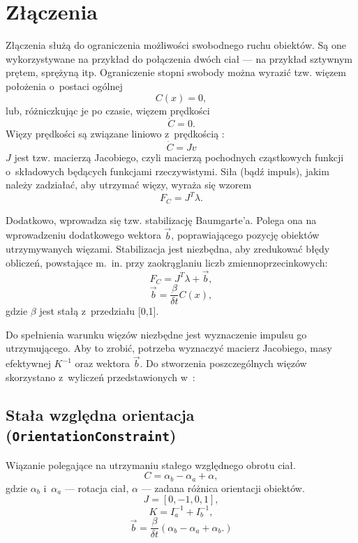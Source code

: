 \section{Złączenia}
Złączenia służą do ograniczenia możliwości swobodnego ruchu obiektów. Są one wykorzystywane na przykład do połączenia dwóch ciał --- na przykład sztywnym prętem, sprężyną itp. 
Ograniczenie stopni swobody można wyrazić tzw. więzem położenia o~postaci ogólnej
\begin{equation}
C(x) = 0,
\end{equation} lub, różniczkując je po czasie, więzem prędkości
\begin{equation}
\dot{C} = 0.
\end{equation}
Więzy prędkości są związane liniowo z~prędkością \cite{bib:catto-modeling-constraints}:
\begin{equation}
\dot{C} = J v 
\end{equation}
$J$ jest tzw. macierzą Jacobiego, czyli macierzą pochodnych cząstkowych funkcji o~składowych będących funkcjami rzeczywistymi. Siła (bądź impuls), jakim należy zadziałać, aby utrzymać więzy, wyraża się wzorem
\begin{equation}
F_C = J^T \lambda.
\end{equation}

Dodatkowo, wprowadza się tzw. stabilizację Baumgarte'a. Polega ona na wprowadzeniu dodatkowego wektora $\vec{b}$, poprawiającego pozycję obiektów utrzymywanych więzami. Stabilizacja jest niezbędna, aby zredukować błędy obliczeń, powstające m.~in. przy zaokrąglaniu liczb zmiennoprzecinkowych:
\begin{equation}
F_C = J^T \lambda + \vec{b},
\end{equation}
\begin{equation}
\vec{b} = \frac{\beta}{\delta t} C(x),
\end{equation}
gdzie $\beta$ jest stałą z~przedziału [0,1].

Do spełnienia warunku więzów niezbędne jest wyznaczenie impulsu go utrzymującego. Aby to zrobić, potrzeba wyznaczyć macierz Jacobiego, masy efektywnej $K^{-1}$ oraz wektora $\vec{b}$. Do stworzenia poszczególnych więzów skorzystano z~wyliczeń przedstawionych w~\cite{bib:barnas}:
\subsection*{Stała względna orientacja (\texttt{OrientationConstraint})}
Wiązanie polegające na utrzymaniu stałego względnego obrotu ciał.
\begin{equation}
C = \alpha_b - \alpha_a + \alpha,
\end{equation}
gdzie $\alpha_b$ i~$\alpha_a$ --- rotacja ciał, $\alpha$ --- zadana różnica orientacji obiektów.
\begin{equation}
J = [0, -1, 0, 1],
\end{equation}
\begin{equation}
K = I_a^{-1}+I_b^{-1},
\end{equation}
\begin{equation}
\vec{b} = \frac{\beta}{\delta t} (\alpha_b-\alpha_a+\alpha_b.)
\end{equation}
